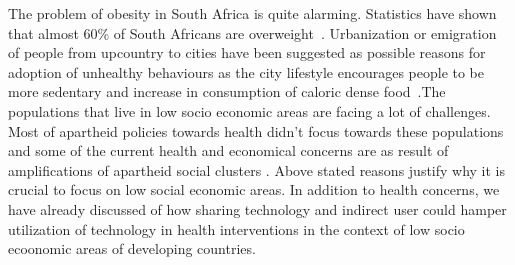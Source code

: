 The problem of obesity in South Africa is quite alarming. Statistics have shown that almost 60\% of South Africans are overweight~\citep{ng:global}. Urbanization or emigration of people from upcountry to cities  have been suggested as possible reasons for adoption of unhealthy behaviours as the city lifestyle encourages people to be more sedentary and increase in consumption of caloric dense food~\citep{ali2009factors}.The populations that live in low socio economic areas are facing a lot of challenges. Most of apartheid policies towards health didn't focus towards these populations and some of the current health and economical concerns are as result of amplifications of apartheid social clusters \citep{benatar2013challenges}. Above stated reasons justify why it is crucial to focus on low social economic areas. In addition to health concerns, we have already discussed of how sharing technology and indirect user could hamper utilization of technology in health interventions in the context of low socio ecoonomic areas of developing countries.    
\begin{flushright}
\end{flushright}
